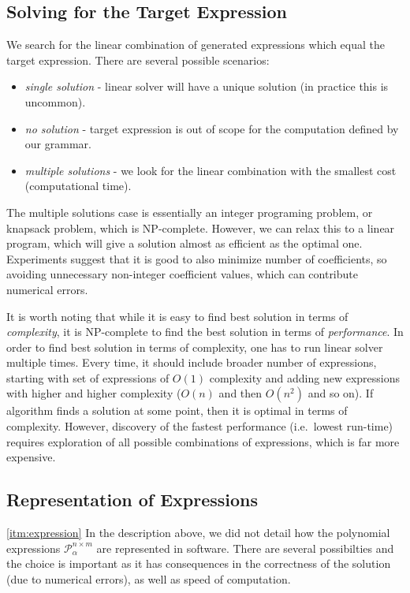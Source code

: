 \subsection{Solving for the Target Expression}
\label{sec:linear}

We search for the linear combination of generated expressions which equal the target expression. 
There are several possible scenarios:
\begin{itemize}
  \item \emph{single solution} - linear solver will have a unique solution (in practice
 this is uncommon).
 \item \emph{no solution} - target expression is out of scope for the computation defined by
our grammar. 
 \item  \emph{multiple solutions} - we look for the linear combination with the smallest cost
(computational time). 
\end{itemize}
The multiple solutions case is essentially an integer programing
problem, or knapsack problem, which is NP-complete. However, we can
relax this to a linear program, which will give a solution almost as
efficient as the optimal one. Experiments suggest that it is good to
also minimize number of coefficients, so avoiding unnecessary
non-integer coefficient values, which can contribute numerical errors.


It is worth noting that while it is easy to find best solution in
terms of {\em complexity}, it is NP-complete to find the best solution
in terms of {\em performance}. In order to find best solution in terms
of complexity, one has to run linear solver multiple times. Every
time, it should include broader number of expressions, starting with set
of expressions of $O(1)$ complexity and adding new expressions with higher and higher complexity
($O(n)$ and then $O(n^2)$ and so on). If algorithm finds a solution at
some point, then it is optimal in terms of complexity. 
However, discovery of the fastest performance (i.e.~lowest
run-time) requires exploration of all possible combinations of expressions,
which is far more expensive.  

\vspace{-2mm}


\subsection{Representation of Expressions} \label{representation}
\ref{itm:expression}
In the description above, we did not detail how the polynomial
expressions $\mathcal{P}^{n \times m}_\alpha$ are represented in software. 
There are several possibilties and the choice is
important as it has consequences in the correctness of the solution
(due to numerical errors), as well as speed of computation.

